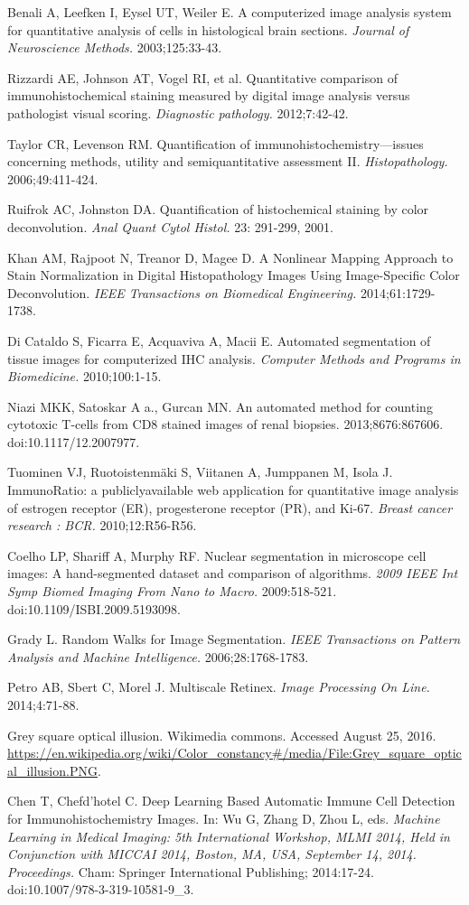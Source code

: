 \documentclass[12pt]{article}
\begin{document}
\noindent[22] Benali A, Leefken I, Eysel UT, Weiler E. A computerized image analysis system for quantitative analysis of cells in histological brain sections. \textit{Journal of Neuroscience Methods.} 2003;125:33-43.

\noindent[23] Rizzardi AE, Johnson AT, Vogel RI, et al. Quantitative comparison of immunohistochemical staining measured by digital image analysis versus pathologist visual scoring. \textit{Diagnostic pathology.} 2012;7:42-42.

\noindent[24] Taylor CR, Levenson RM. Quantification of immunohistochemistry---issues concerning methods, utility and semiquantitative assessment II. \textit{Histopathology.} 2006;49:411-424.

\noindent[25] Ruifrok AC, Johnston DA. Quantification of histochemical staining by color deconvolution. \textit{Anal Quant Cytol Histol.} 23: 291-299, 2001.

\noindent[26] Khan AM, Rajpoot N, Treanor D, Magee D. A Nonlinear Mapping Approach to Stain Normalization in Digital Histopathology Images Using Image-Specific Color Deconvolution. \textit{IEEE Transactions on Biomedical Engineering.} 2014;61:1729-1738.

\noindent[27] Di Cataldo S, Ficarra E, Acquaviva A, Macii E. Automated segmentation of tissue images for computerized IHC analysis. \textit{Computer Methods and Programs in Biomedicine.} 2010;100:1-15.

\noindent[28] Niazi MKK, Satoskar A a., Gurcan MN. An automated method for counting cytotoxic T-cells from CD8 stained images of renal biopsies. 2013;8676:867606. doi:10.1117/12.2007977.

\noindent[29] Tuominen VJ, Ruotoistenmäki S, Viitanen A, Jumppanen M, Isola J. ImmunoRatio: a publiclyavailable web application for quantitative image analysis of estrogen receptor (ER), progesterone receptor (PR), and Ki-67. \textit{Breast cancer research : BCR.} 2010;12:R56-R56.

\noindent[30] Coelho LP, Shariff A, Murphy RF. Nuclear segmentation in microscope cell images: A hand-segmented dataset and comparison of algorithms. \textit{2009 IEEE Int Symp Biomed Imaging From Nano to Macro.} 2009:518-521. doi:10.1109/ISBI.2009.5193098.

\noindent[31] Grady L. Random Walks for Image Segmentation. \textit{IEEE Transactions on Pattern Analysis and Machine Intelligence.} 2006;28:1768-1783.

\noindent[32] Petro AB, Sbert C, Morel J. Multiscale Retinex. \textit{Image Processing On Line.} 2014;4:71-88.

\noindent[33] Grey square optical illusion. Wikimedia commons. Accessed August 25, 2016. \url{https://en.wikipedia.org/wiki/Color_constancy#/media/File:Grey_square_optical_illusion.PNG}. 

\noindent[34] Chen T, Chefd’hotel C. Deep Learning Based Automatic Immune Cell Detection for Immunohistochemistry Images. In: Wu G, Zhang D, Zhou L, eds. \textit{Machine Learning in Medical Imaging: 5th International Workshop, MLMI 2014, Held in Conjunction with MICCAI 2014, Boston, MA, USA, September 14, 2014. Proceedings.} Cham: Springer International Publishing; 2014:17-24. doi:10.1007/978-3-319-10581-9\_3.
\end{document}
